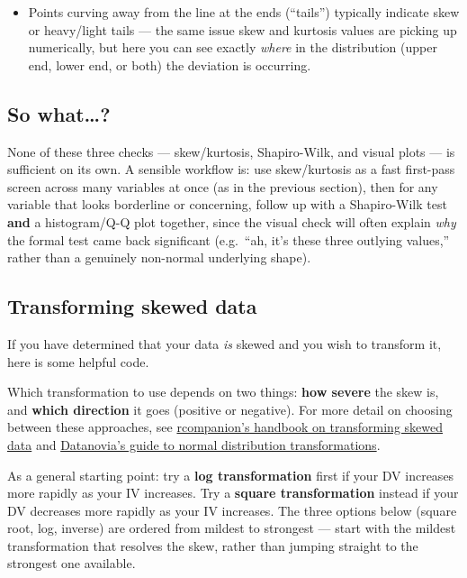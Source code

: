 \documentclass[
  letterpaper,
  DIV=11,
  numbers=noendperiod]{scrreprt}
\providecommand{\tightlist}{%
  \setlength{\itemsep}{0pt}\setlength{\parskip}{0pt}}\usepackage{longtable,booktabs,array}
\begin{document}
\begin{itemize}
\tightlist
\item
  Points curving away from the line at the ends (``tails'') typically
  indicate skew or heavy/light tails --- the same issue skew and
  kurtosis values are picking up numerically, but here you can see
  exactly \emph{where} in the distribution (upper end, lower end, or
  both) the deviation is occurring.
\end{itemize}

\subsection{So what\ldots?}\label{so-what}

None of these three checks --- skew/kurtosis, Shapiro-Wilk, and visual
plots --- is sufficient on its own. A sensible workflow is: use
skew/kurtosis as a fast first-pass screen across many variables at once
(as in the previous section), then for any variable that looks
borderline or concerning, follow up with a Shapiro-Wilk test
\textbf{and} a histogram/Q-Q plot together, since the visual check will
often explain \emph{why} the formal test came back significant
(e.g.~``ah, it's these three outlying values,'' rather than a genuinely
non-normal underlying shape).

\subsection{Transforming skewed data}\label{transforming-skewed-data}

If you have determined that your data \emph{is} skewed and you wish to
transform it, here is some helpful code.

Which transformation to use depends on two things: \textbf{how severe}
the skew is, and \textbf{which direction} it goes (positive or
negative). For more detail on choosing between these approaches, see
\href{https://rcompanion.org/handbook/I_12.html}{rcompanion's handbook
on transforming skewed data} and
\href{https://www.datanovia.com/en/lessons/transform-data-to-normal-distribution-in-r/}{Datanovia's
guide to normal distribution transformations}.

As a general starting point: try a \textbf{log transformation} first if
your DV increases more rapidly as your IV increases. Try a
\textbf{square transformation} instead if your DV decreases more rapidly
as your IV increases. The three options below (square root, log,
inverse) are ordered from mildest to strongest --- start with the
mildest transformation that resolves the skew, rather than jumping
straight to the strongest one available.
\end{document}
